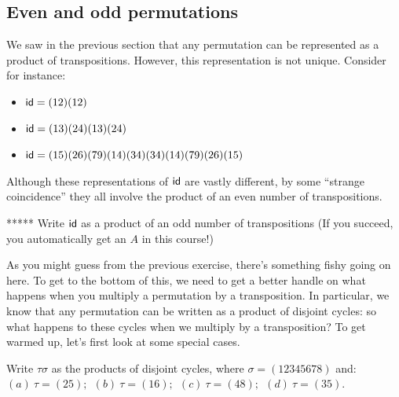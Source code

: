 \subsection{Even and odd permutations}

We saw in the previous section that any permutation can be represented as a product of transpositions. However, this representation is not unique. Consider for instance:
\begin{itemize}
\item
${\sf{i}d}  = (1 2) ( 1 2)$
\item
${\sf{i}d}  = (1 3 )(2 4 )(1 3 )( 2 4 )$
\item
${\sf{i}d}  = (1 5 )(2 6 )(7 9 )( 1 4 )(3 4)(3 4)(1 4)(7 9)(2 6)(1 5)$
\end{itemize}

\noindent
Although these representations of ${\sf{i}d} $ are vastly different, by some ``strange coincidence'' they all involve the product of an even number of 
transpositions.  

%
%
%
%
\begin{exercise}{}
***** Write ${\sf{i}d} $ as a product of an odd number of transpositions (If you succeed, you automatically get an $A$ in this course!)
\end{exercise}

As you might guess from the previous exercise, there's something fishy going on here. 
To get to the bottom of this, we need to  get a better handle on what happens when you multiply a permutation by a transposition. 
In particular, we know that any permutation can be written as a product of  disjoint cycles: so what happens to these cycles when we multiply by a transposition? To get warmed up, let's first look at some special cases.

\begin{exercise}{}
Write $\tau \sigma$  as the products of disjoint cycles, where $\sigma = (12345678)$ and:
$(a)~\tau= (25);~~ (b)~\tau= (16);~~ (c)~\tau=(48) ;~~ (d)~\tau=(35)$.
\end{exercise}


